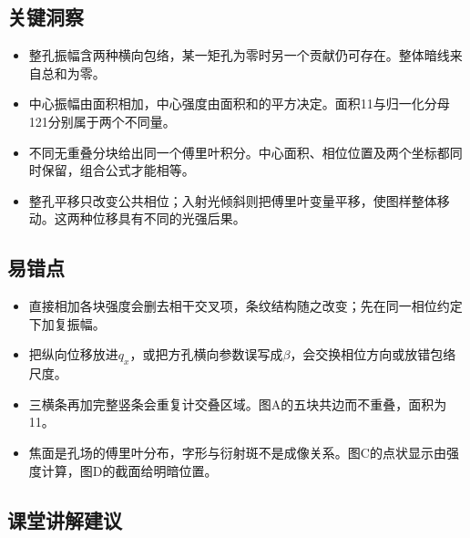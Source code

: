 \documentclass[UTF8,fontset=fandol,a4paper,11pt]{ctexart}
\begin{document}


\subsection*{关键洞察}

\begin{itemize}
\item 整孔振幅含两种横向包络，某一矩孔为零时另一个贡献仍可存在。整体暗线来自总和为零。
\item 中心振幅由面积相加，中心强度由面积和的平方决定。面积11与归一化分母121分别属于两个不同量。
\item 不同无重叠分块给出同一个傅里叶积分。中心面积、相位位置及两个坐标都同时保留，组合公式才能相等。
\item 整孔平移只改变公共相位；入射光倾斜则把傅里叶变量平移，使图样整体移动。这两种位移具有不同的光强后果。
\end{itemize}



\subsection*{易错点}

\begin{itemize}
\item 直接相加各块强度会删去相干交叉项，条纹结构随之改变；先在同一相位约定下加复振幅。
\item 把纵向位移放进$q_x$，或把方孔横向参数误写成$\beta$，会交换相位方向或放错包络尺度。
\item 三横条再加完整竖条会重复计交叠区域。图A的五块共边而不重叠，面积为11。
\item 焦面是孔场的傅里叶分布，字形与衍射斑不是成像关系。图C的点状显示由强度计算，图D的截面给明暗位置。
\end{itemize}



\subsection*{课堂讲解建议}
\end{document}
